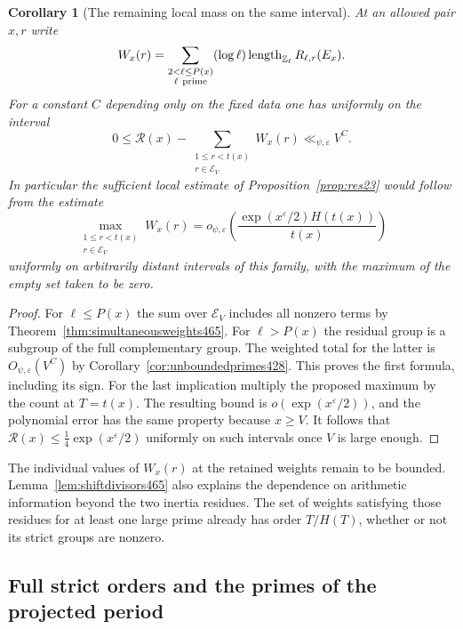 \documentclass[a4paper,11pt]{article}
\newtheorem{corollary}[proposition]{Corollary}
\theoremstyle{definition}
\theoremstyle{remark}
\newcommand{\ZZ}{\mathbb Z}\newcommand{\ord}{\operatorname{ord}}
\numberwithin{equation}{section}
\begin{document}
\begin{corollary}[The remaining local mass on the same interval]\leavevmode
\label{cor:supportmass465}
At an allowed pair \(x,r\) write
\[
        W_x(r)=\sum_{\substack{2<\ell\le P(x)\\\ell\ {\rm prime}}}
                   (\log\ell)\operatorname{length}_{\ZZ_\ell}
                         R_{\ell,r}(E_x).
\]
For a constant \(C\) depending only on the fixed data one has
uniformly on the interval
\[
 0\le \mathcal R(x)-
       \sum_{\substack{1\le r<t(x)\\r\in\mathcal E_V}} W_x(r)
                      \ll_{\psi,\varepsilon} V^C.
\]
In particular the sufficient local estimate of
Proposition~\ref{prop:res23} would follow from the estimate
\[
 \max_{\substack{1\le r<t(x)\\r\in\mathcal E_V}} W_x(r)
       =o_{\psi,\varepsilon}\!
          \left(\frac{\exp(x^\varepsilon/2)H(t(x))}{t(x)}\right)
\]
uniformly on arbitrarily distant intervals of this family, with
the maximum of the empty set taken to be zero.
\end{corollary}
\begin{proof}
For \(\ell\le P(x)\) the sum over \(\mathcal E_V\) includes all
nonzero terms by Theorem~\ref{thm:simultaneousweights465}.
For \(\ell>P(x)\) the residual group is a subgroup of the full
complementary group. The weighted total for the latter is
\(O_{\psi,\varepsilon}(V^C)\) by
Corollary~\ref{cor:unboundedprimes428}. This proves the first
formula, including its sign. For the last implication multiply
the proposed maximum by the count at \(T=t(x)\). The resulting
bound is \(o(\exp(x^\varepsilon/2))\), and the polynomial error
has the same property because \(x\ge V\). It follows that
\(\mathcal R(x)\le \tfrac14\exp(x^\varepsilon/2)\) uniformly on
such intervals once \(V\) is large enough.
\end{proof}

The individual values of \(W_x(r)\) at the retained weights
remain to be bounded. Lemma~\ref{lem:shiftdivisors465} also
explains the dependence on arithmetic information beyond the
two inertia residues. The set of weights satisfying those
residues for at least one large prime already has order
\(T/H(T)\), whether or not its strict groups are nonzero.


\subsection{Full strict orders and the primes of the projected period}
\label{sec:sameprimes517}
\end{document}
